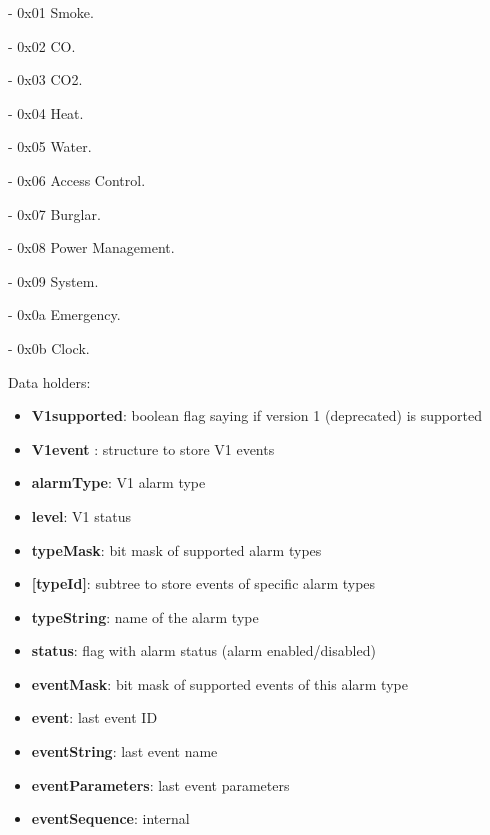- 0x01 Smoke. 

- 0x02 CO. 

- 0x03 CO2. 

- 0x04 Heat. 

- 0x05 Water. 

- 0x06 Access Control. 

- 0x07 Burglar. 

- 0x08 Power Management. 

- 0x09 System. 

- 0x0a Emergency. 

- 0x0b Clock.
\newline

\noindent
Data holders:

\begin{itemize}
\item \textbf{V1supported}: boolean flag saying if version 1 (deprecated) is supported
\item \textbf{V1event }: structure to store V1 events
\item \qquad\textbf{alarmType}: V1 alarm type
\item \qquad\textbf{level}: V1 status
\item \textbf{typeMask}: bit mask of supported alarm types
\item \textbf{[typeId]}: subtree to store events of specific alarm types
\item \qquad\textbf{typeString}: name of the alarm type
\item \qquad\textbf{status}: flag with alarm status (alarm enabled/disabled)
\item \qquad\textbf{eventMask}: bit mask of supported events of this alarm type
\item \qquad\textbf{event}: last event ID
\item \qquad\textbf{eventString}: last event name
\item \qquad\textbf{eventParameters}: last event parameters
\item \qquad\textbf{eventSequence}: internal
\end{itemize}

